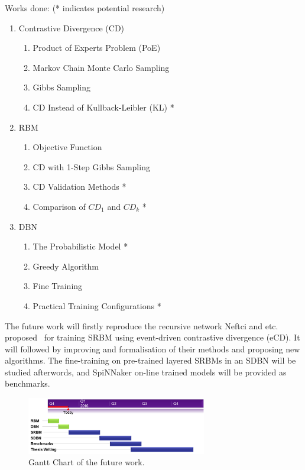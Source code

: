 \documentclass[journal]{journal}
\begin{document}
	Works done: (* indicates potential research)
	\begin{enumerate}
		\item Contrastive Divergence (CD)
			\begin{enumerate}
				\item Product of Experts Problem (PoE)
				\item Markov Chain Monte Carlo Sampling
				\item Gibbs Sampling
				\item CD Instead of Kullback-Leibler (KL) *
			\end{enumerate}	
		\item RBM
			\begin{enumerate}
				\item Objective Function
				\item CD with 1-Step Gibbs Sampling
				\item CD Validation Methods *
				\item Comparison of $CD_1$ and $CD_k$ *
			\end{enumerate}
		\item DBN
			\begin{enumerate}
				\item The Probabilistic Model *
				\item Greedy Algorithm
				\item Fine Training
				\item Practical Training Configurations *
			\end{enumerate}	
	\end{enumerate}			
	
	The future work will firstly reproduce the recursive network Neftci and etc. proposed~\cite{neftci2013event} for training SRBM using event-driven contrastive divergence (eCD).
	It will followed by improving and formalisation of their methods and proposing new algorithms.
	The fine-training on pre-trained layered SRBMs in an SDBN will be studied afterwords, and SpiNNaker on-line trained models will be provided as benchmarks.

		\begin{figure}[hbt]
			\centering
			\includegraphics[width=0.7\textwidth]{images/gantt.png}
			\caption{Gantt Chart of the future work.}
			\label{fig:gannt}
		\end{figure}
\end{document}
